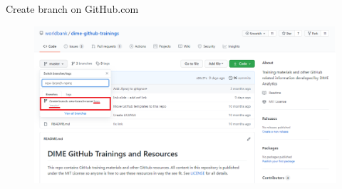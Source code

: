 \documentclass[aspectratio=169]{beamer} %
\begin{document}
\begin{frame}{Create branch on GitHub.com}
\begin{figure}
	\centering
	\includegraphics[width=.9\textwidth]{./img/new-branch-3.png}
\end{figure}
\hyperlink{Create a branch}{}
\end{frame}
\end{document}
